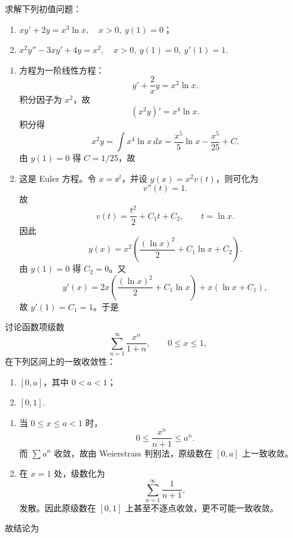 ﻿


\begin{question}
求解下列初值问题：
\begin{enumerate}[label=(\arabic*),leftmargin=2.8em,itemsep=0.2em]
\item $xy'+2y=x^3\ln x,\quad x>0,\ y(1)=0$；
\item $x^2y''-3xy'+4y=x^2,\quad x>0,\ y(1)=0,\ y'(1)=1$.
\end{enumerate}
\begin{solution}

\begin{enumerate}[label=(\arabic*),leftmargin=2.8em,itemsep=0.2em]
\item 方程为一阶线性方程：
\[
y'+\frac{2}{x}y=x^2\ln x.
\]
积分因子为 $x^2$，故
\[
(x^2y)'=x^4\ln x.
\]
积分得
\[
x^2y=\int x^4\ln x\,dx=
\frac{x^5}{5}\ln x-\frac{x^5}{25}+C.
\]
由 $y(1)=0$ 得 $C=1/25$，故

\item 这是 Euler 方程。令 $x=\ee^{t}$，并设 $y(x)=x^2v(t)$，则可化为
\[
v''(t)=1.
\]
故
\[
v(t)=\frac{t^2}{2}+C_1t+C_2,
\qquad t=\ln x.
\]
因此
\[
y(x)=x^2\left(\frac{(\ln x)^2}{2}+C_1\ln x+C_2\right).
\]
由 $y(1)=0$ 得 $C_2=0$。又
\[
y'(x)=2x\left(\frac{(\ln x)^2}{2}+C_1\ln x\right)+x(\ln x+C_1),
\]
故 $y'(1)=C_1=1$。于是
\end{enumerate}
\end{solution}
\end{question}

\begin{question}
讨论函数项级数
\[
\sum_{n=1}^{\infty}\frac{x^n}{1+n},
\qquad 0\le x\le 1,
\]
在下列区间上的一致收敛性：
\begin{enumerate}[label=(\arabic*),leftmargin=2.8em,itemsep=0.2em]
\item $[0,a]$，其中 $0<a<1$；
\item $[0,1]$.
\end{enumerate}
\begin{solution}

\begin{enumerate}[label=(\arabic*),leftmargin=2.8em,itemsep=0.2em]
\item 当 $0\le x\le a<1$ 时，
\[
0\le \frac{x^n}{n+1}\le a^n.
\]
而 $\sum a^n$ 收敛，故由 Weierstrass 判别法，原级数在 $[0,a]$ 上一致收敛。

\item 在 $x=1$ 处，级数化为
\[
\sum_{n=1}^{\infty}\frac1{n+1},
\]
发散。因此原级数在 $[0,1]$ 上甚至不逐点收敛，更不可能一致收敛。
\end{enumerate}
故结论为
\end{solution}
\end{question}

